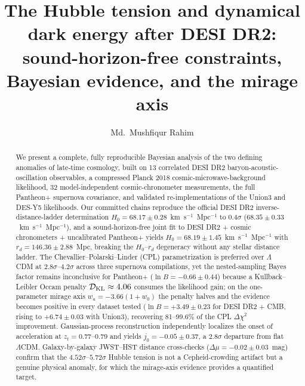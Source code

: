 \documentclass[aps,prd,preprint,superscriptaddress,nofootinbib]{revtex4-2}
\begin{document}
\title{The Hubble tension and dynamical dark energy after DESI DR2: sound-horizon-free constraints, Bayesian evidence, and the mirage axis}

\author{Md.~Mushfiqur Rahim}

\begin{abstract}
We present a complete, fully reproducible Bayesian analysis of the two defining anomalies of late-time cosmology, built on 13 correlated DESI DR2 baryon-acoustic-oscillation observables, a compressed Planck 2018 cosmic-microwave-background likelihood, 32 model-independent cosmic-chronometer measurements, the full Pantheon+ supernova covariance, and validated re-implementations of the Union3 and DES-Y5 likelihoods. Our committed chains reproduce the official DESI DR2 inverse-distance-ladder determination $H_0 = 68.17 \pm 0.28$~km~s$^{-1}$~Mpc$^{-1}$ to $0.4\sigma$ ($68.35 \pm 0.33$~km~s$^{-1}$~Mpc$^{-1}$), and a sound-horizon-free joint fit to DESI DR2 + cosmic chronometers + uncalibrated Pantheon+ yields $H_0 = 68.19 \pm 1.45$~km~s$^{-1}$~Mpc$^{-1}$ with $r_d = 146.36 \pm 2.88$~Mpc, breaking the $H_0$--$r_d$ degeneracy without any stellar distance ladder. The Chevallier--Polarski--Linder (CPL) parametrization is preferred over $\Lambda$CDM at $2.8\sigma$--$4.2\sigma$ across three supernova compilations, yet the nested-sampling Bayes factor remains inconclusive for Pantheon+ ($\ln B = -0.66 \pm 0.44$) because a Kullback--Leibler Occam penalty $\mathcal{D}_{\rm KL} \approx 4.06$ consumes the likelihood gain; on the one-parameter mirage axis $w_a = -3.66(1+w_0)$ the penalty halves and the evidence becomes positive in every dataset tested ($\ln B = +3.49 \pm 0.23$ for DESI DR2 + CMB, rising to $+6.74 \pm 0.03$ with Union3), recovering 81--99.6\% of the CPL $\Delta\chi^2$ improvement. Gaussian-process reconstruction independently localizes the onset of acceleration at $z_t = 0.77$--$0.79$ and yields $j_0 = -0.05 \pm 0.37$, a $2.8\sigma$ departure from flat $\Lambda$CDM. Galaxy-by-galaxy JWST--HST distance cross-checks ($\Delta\mu = -0.02 \pm 0.03$~mag) confirm that the $4.52\sigma$--$5.72\sigma$ Hubble tension is not a Cepheid-crowding artifact but a genuine physical anomaly, for which the mirage-axis evidence provides a quantified target.
\end{abstract}

\maketitle
\end{document}
